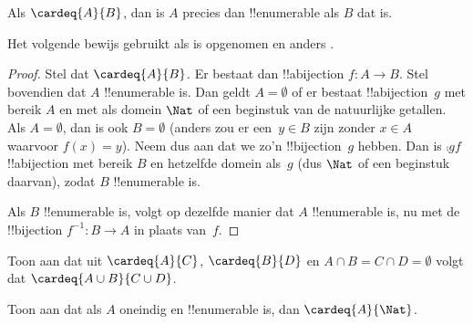 \documentclass[../../../include/open-logic-section]{subfiles}
\begin{document}
\begin{prop}
Als $\cardeq{A}{B}$, dan is $A$ precies dan !!{enumerable} als $B$ dat is.
\end{prop}

\begin{editorial}
Het volgende bewijs gebruikt  als
 is opgenomen en anders .
\end{editorial}

\begin{proof}
Stel dat $\cardeq{A}{B}$. Er bestaat dan !!a{bijection} $f \colon A
\to B$. Stel bovendien dat $A$ !!{enumerable} is.
{
  Dan geldt $A = \emptyset$ of er bestaat !!a{bijection}~$g$ met bereik
  $A$ en met als domein $\Nat$ of een beginstuk van de natuurlijke getallen. Als
  $A = \emptyset$, dan is ook $B = \emptyset$ (anders zou er een~$y \in B$
  zijn zonder $x \in A$ waarvoor $f(x) = y$). Neem dus aan dat we zo'n
  !!{bijection}~$g$ hebben. Dan is $\comp{g}{f}$ !!a{bijection} met bereik
  $B$ en hetzelfde domein als~$g$ (dus $\Nat$ of een beginstuk daarvan),
  zodat $B$ !!{enumerable} is.}

Als $B$ !!{enumerable} is, volgt op dezelfde manier dat $A$ !!{enumerable}
is, nu met de !!{bijection} $f^{-1}\colon B \to A$ in plaats van~$f$.
\end{proof}

\begin{prob}
Toon aan dat uit $\cardeq{A}{C}$, $\cardeq{B}{D}$ en $A \cap B =
C \cap D = \emptyset$ volgt dat $\cardeq{A \cup B}{C \cup D}$.
\end{prob}

\begin{prob}
Toon aan dat als $A$ oneindig en !!{enumerable} is, dan
$\cardeq{A}{\Nat}$.
\end{prob}
\end{document}
